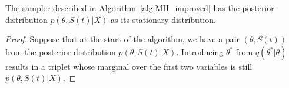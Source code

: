 \begin{proposition}
  The sampler described in Algorithm~\ref{alg:MH_improved} has the posterior
  distribution $p(\theta,S(t)|X)$ as its stationary distribution.
\end{proposition}
\begin{proof}
  Suppose that at the start of the algorithm, we have a pair $(\theta,S(t))$ from
  the posterior distribution $p(\theta,S(t)|X)$. Introducing $\theta^*$
  from $q(\theta^*|\theta)$ results in a triplet whose marginal over the first
  two variables is still $p(\theta,S(t)|X)$.


\end{proof}
